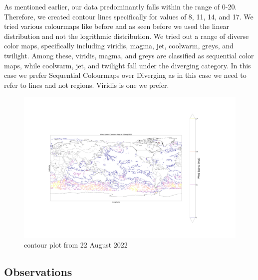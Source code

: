 \documentclass[conference]{IEEEtran}
\begin{document}
As mentioned earlier, our data predominantly falls within the range of 0-20. Therefore, we created contour lines specifically for values of 8, 11, 14, and 17. We tried various colourmaps like before and as seen before we used the linear distribution and not the logrithmic distribution. We tried out  a range of diverse color maps, specifically including viridis, magma, jet, coolwarm, greys, and twilight. Among these, viridis, magma, and greys are classified as sequential color maps, while coolwarm, jet, and twilight fall under the diverging category. In this case we prefer Sequential Colourmaps over Diverging as in this case we need to refer to lines and not regions. Viridis is one we prefer.
\begin{figure}
    \centering
    \includegraphics[scale=0.05]{images_deep/contour_plasma.png}
    \caption{contour plot from 22 August 2022}
    \label{contour}
\end{figure}


\subsection{Observations}
\end{document}
